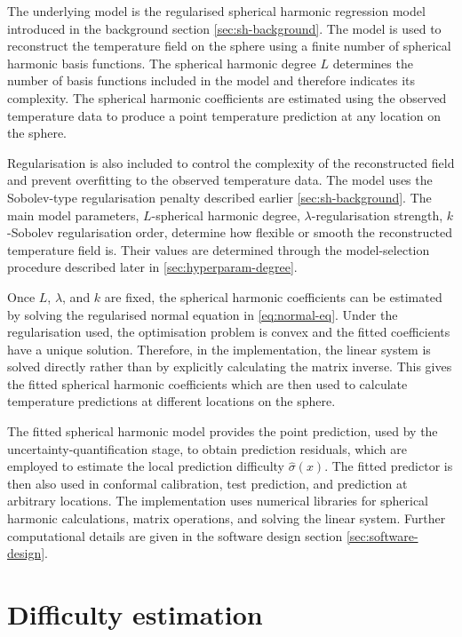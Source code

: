 The underlying model is the regularised spherical harmonic regression model introduced in the background section \cref{sec:sh-background}. The model is used to reconstruct the temperature field on the sphere using a finite number of spherical harmonic basis functions. The spherical harmonic degree $L$ determines the number of basis functions included in the model and therefore indicates its complexity. The spherical harmonic coefficients are estimated using the observed temperature data to produce a point temperature prediction at any location on the sphere.
 
Regularisation is also included to control the complexity of the reconstructed field and prevent overfitting to the observed temperature data. The model uses the Sobolev-type regularisation penalty described earlier \cref{sec:sh-background}. The main model parameters, $L$-spherical harmonic degree, $\lambda$-regularisation strength, $k$-Sobolev regularisation order, determine how flexible or smooth the reconstructed temperature field is. Their values are determined through the model-selection procedure described later in \cref{sec:hyperparam-degree}.

Once $L$, $\lambda$, and $k$ are fixed, the spherical harmonic coefficients can be estimated by solving the regularised normal equation in \cref{eq:normal-eq}. Under the regularisation used, the optimisation problem is convex and the fitted coefficients have a unique solution. Therefore, in the implementation, the linear system is solved directly rather than by explicitly calculating the matrix inverse.  This gives the fitted spherical harmonic coefficients which are then used to calculate temperature predictions at different locations on the sphere.

The fitted spherical harmonic model provides the point prediction, used by the uncertainty-quantification stage, to obtain prediction residuals, which are employed to estimate the local prediction difficulty $\hat{\sigma}(x)$. The fitted predictor is then also used in conformal calibration, test prediction, and prediction at arbitrary locations. The implementation uses numerical libraries for spherical harmonic calculations, matrix operations, and solving the linear system. Further computational details are given in the software design section \cref{sec:software-design}.

\section{Difficulty estimation}
 
